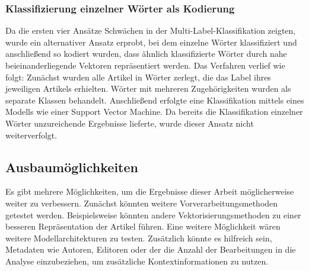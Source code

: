 \subsubsection{Klassifizierung einzelner Wörter als Kodierung}
\label{sec:wordcoding}
Da die ersten vier Ansätze Schwächen in der Multi-Label-Klassifikation zeigten, wurde ein alternativer Ansatz erprobt, bei dem einzelne Wörter klassifiziert und anschließend so kodiert wurden, dass ähnlich klassifizierte Wörter durch nahe beieinanderliegende Vektoren repräsentiert werden. Das Verfahren verlief wie folgt: Zunächst wurden alle Artikel in Wörter zerlegt, die das Label ihres jeweiligen Artikels erhielten. Wörter mit mehreren Zugehörigkeiten wurden als separate Klassen behandelt. Anschließend erfolgte eine Klassifikation mittels eines Modells wie einer Support Vector Machine. Da bereits die Klassifikation einzelner Wörter unzureichende Ergebnisse lieferte, wurde dieser Ansatz nicht weiterverfolgt.

\subsection{Ausbaumöglichkeiten}
Es gibt mehrere Möglichkeiten, um die Ergebnisse dieser Arbeit möglicherweise weiter zu verbessern. Zunächst könnten weitere Vorverarbeitungsmethoden getestet werden. Beispielsweise könnten andere Vektorisierungsmethoden zu einer besseren Repräsentation der Artikel führen. Eine weitere Möglichkeit wären weitere Modellarchitekturen zu testen. Zusätzlich könnte es hilfreich sein, Metadaten wie Autoren, Editoren oder der die Anzahl der Bearbeitungen in die Analyse einzubeziehen, um zusätzliche Kontextinformationen zu nutzen.
